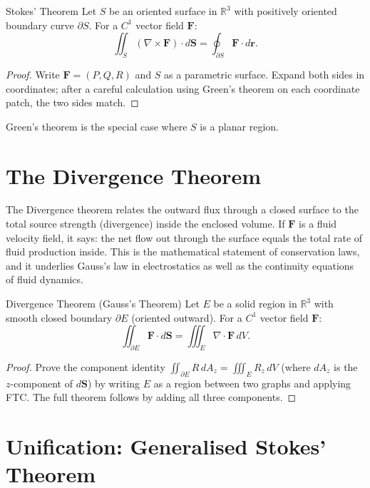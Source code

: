 \documentclass[12pt, openany]{book}
\theoremstyle{plain}
\theoremstyle{definition}
\theoremstyle{remark}
\newcommand{\R}{\mathbb{R}}
\begin{document}
\begin{thmbox}{Stokes' Theorem}
Let $S$ be an oriented surface in $\R^3$ with positively oriented boundary curve
$\partial S$.  For a $C^1$ vector field $\mathbf{F}$:
\[\iint_S (\nabla\times\mathbf{F})\cdot d\mathbf{S}
  = \oint_{\partial S} \mathbf{F}\cdot d\mathbf{r}.\]
\end{thmbox}
\color{black}

\begin{proof}
Write $\mathbf{F}=(P,Q,R)$ and $S$ as a parametric surface.
Expand both sides in coordinates; after a careful calculation using Green's
theorem on each coordinate patch, the two sides match.
\end{proof}

Green's theorem is the special case where $S$ is a planar region.

\section{The Divergence Theorem}

The Divergence theorem relates the outward flux through a closed surface to the total source strength (divergence) inside the enclosed volume.  If $\mathbf{F}$ is a fluid velocity field, it says: the net flow out through the surface equals the total rate of fluid production inside.  This is the mathematical statement of conservation laws, and it underlies Gauss's law in electrostatics as well as the continuity equations of fluid dynamics.

\begin{thmbox}{Divergence Theorem (Gauss's Theorem)}
Let $E$ be a solid region in $\R^3$ with smooth closed boundary $\partial E$
(oriented outward).  For a $C^1$ vector field $\mathbf{F}$:
\[\iint_{\partial E} \mathbf{F}\cdot d\mathbf{S}
  = \iiint_E \nabla\cdot\mathbf{F}\,dV.\]
\end{thmbox}
\color{black}

\begin{proof}
Prove the component identity $\iint_{\partial E} R\,dA_z = \iiint_E R_z\,dV$
(where $dA_z$ is the $z$-component of $d\mathbf{S}$) by writing $E$ as a
region between two graphs and applying FTC.  The full theorem follows by adding
all three components.
\end{proof}

\section{Unification: Generalised Stokes' Theorem}
\end{document}
